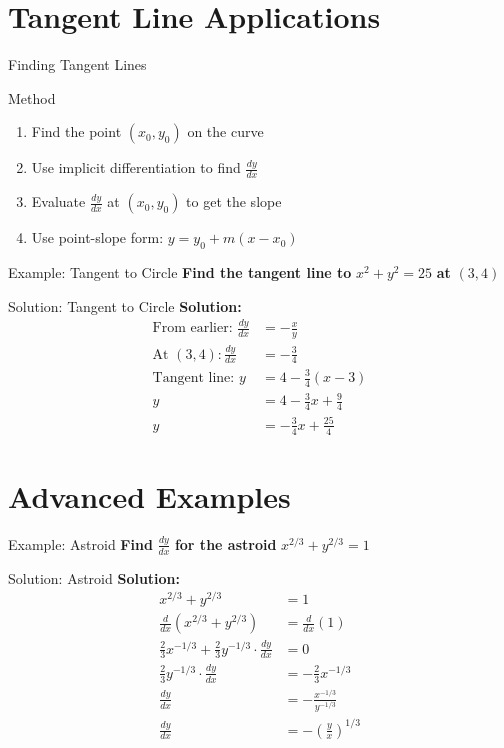 \documentclass[aspectratio=169]{beamer}
\begin{document}
\section{Tangent Line Applications}

\begin{frame}{Finding Tangent Lines}
\begin{block}{Method}
\begin{enumerate}
  \item Find the point $(x_0, y_0)$ on the curve
  \item Use implicit differentiation to find $\frac{dy}{dx}$
  \item Evaluate $\frac{dy}{dx}$ at $(x_0, y_0)$ to get the slope
  \item Use point-slope form: $y = y_0 + m(x - x_0)$
\end{enumerate}
\end{block}
\end{frame}

\begin{frame}{Example: Tangent to Circle}
\textbf{Find the tangent line to } $x^2 + y^2 = 25$ \textbf{ at } $(3, 4)$
\end{frame}

\begin{frame}{Solution: Tangent to Circle}
\textbf{Solution:}
\[
\begin{aligned}
  \text{From earlier: } \frac{dy}{dx} &= -\frac{x}{y} \\
  \text{At } (3, 4): \frac{dy}{dx} &= -\frac{3}{4} \\
  \text{Tangent line: } y &= 4 - \frac{3}{4}(x - 3) \\
  y &= 4 - \frac{3}{4}x + \frac{9}{4} \\
  y &= -\frac{3}{4}x + \frac{25}{4}
\end{aligned}
\]
\end{frame}

\section{Advanced Examples}

\begin{frame}{Example: Astroid}
\textbf{Find } $\frac{dy}{dx}$ \textbf{ for the astroid } $x^{2/3} + y^{2/3} = 1$
\end{frame}

\begin{frame}{Solution: Astroid}
\textbf{Solution:}
\[
\begin{aligned}
  x^{2/3} + y^{2/3} &= 1 \\
  \frac{d}{dx}(x^{2/3} + y^{2/3}) &= \frac{d}{dx}(1) \\
  \frac{2}{3}x^{-1/3} + \frac{2}{3}y^{-1/3} \cdot \frac{dy}{dx} &= 0 \\
  \frac{2}{3}y^{-1/3} \cdot \frac{dy}{dx} &= -\frac{2}{3}x^{-1/3} \\
  \frac{dy}{dx} &= -\frac{x^{-1/3}}{y^{-1/3}} \\
  \frac{dy}{dx} &= -\left(\frac{y}{x}\right)^{1/3}
\end{aligned}
\]
\end{frame}
\end{document}
